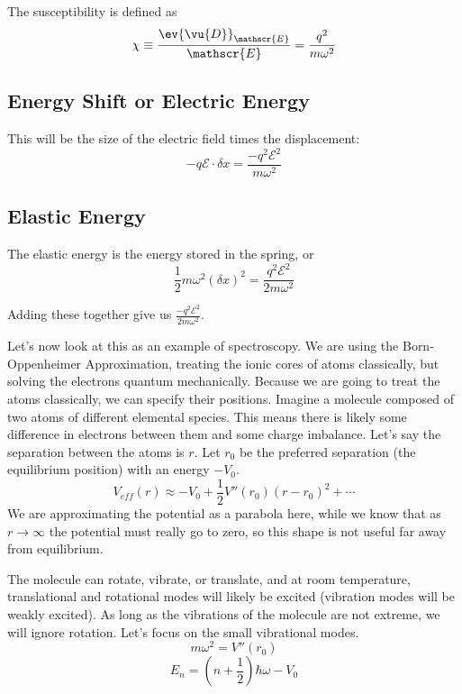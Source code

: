 \documentclass[a4paper,twoside,master.tex]{subfiles}
\begin{document}
The susceptibility is defined as
\begin{equation}
    \chi \equiv \frac{\ev{ \vu{D}}_{\mathscr{E}}}{\mathscr{E}} = \frac{q^2}{m \omega^2}
\end{equation}

\subsection{Energy Shift or Electric Energy}
\label{sub:energy_shift_or_electric_energy}

This will be the size of the electric field times the displacement:
\begin{equation}
    -q\mathscr{E} \cdot \delta x = \frac{-q^2 \mathscr{E}^2}{m \omega^2}
\end{equation}

\subsection{Elastic Energy}
\label{sub:elastic_energy}

The elastic energy is the energy stored in the spring, or
\begin{equation}
    \frac{1}{2} m \omega^2 (\delta x)^2 = \frac{q^2 \mathscr{E}^2}{2 m \omega^2}
\end{equation}

Adding these together give us $ \frac{- q^2 \mathscr{E}^2}{2 m \omega^2} $.

Let's now look at this as an example of spectroscopy. We are using the Born-Oppenheimer Approximation, treating the ionic cores of atoms classically, but solving the electrons quantum mechanically. Because we are going to treat the atoms classically, we can specify their positions. Imagine a molecule composed of two atoms of different elemental species. This means there is likely some difference in electrons between them and some charge imbalance. Let's say the separation between the atoms is $ r $. Let $ r_0 $ be the preferred separation (the equilibrium position) with an energy $ -V_0 $.
\begin{equation}
    V_{eff}(r) \approx - V_0 + \frac{1}{2} V''(r_0)(r-r_0)^2 + \cdots
\end{equation}
We are approximating the potential as a parabola here, while we know that as $ r \to \infty $ the potential must really go to zero, so this shape is not useful far away from equilibrium.

The molecule can rotate, vibrate, or translate, and at room temperature, translational and rotational modes will likely be excited (vibration modes will be weakly excited). As long as the vibrations of the molecule are not extreme, we will ignore rotation. Let's focus on the small vibrational modes.
\begin{equation}
    m \omega^2 = V''(r_0)
\end{equation}
\begin{equation}
    E_n = \left( n + \frac{1}{2} \right) \hbar \omega - V_0 
\end{equation}
\end{document}
